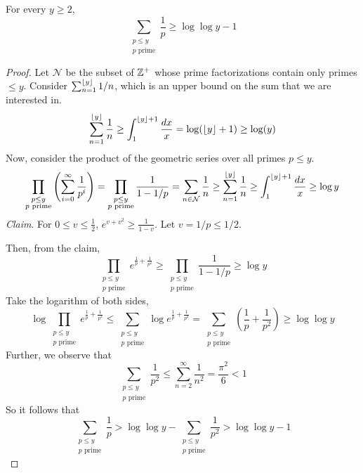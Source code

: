 \begin{theorem}
    For every $y \geq 2$,
    $$
    \sum_{\substack{p \leq y \\ \text{$p$ prime}}} \frac{1}{p} \geq \log \log y - 1
    $$
\end{theorem}

\begin{proof}
    Let $\mathcal{N}$ be the subset of $\mathbb{Z}^+$ whose prime factorizations contain only primes $\leq y$. Consider $\sum_{n=1}^{\lfloor y\rfloor} 1/n$, which is an upper bound on the sum that we are interested in.
    \begin{equation}
    \sum_{n=1}^{\lfloor y\rfloor} \frac{1}{n} \geq \int_{1}^{\lfloor y\rfloor + 1} \frac{dx}{x} = \log (\lfloor y\rfloor+1) \geq \log (y)
    \end{equation}
    Now, consider the product of the geometric series over all primes $p \leq y$.
    \begin{equation}
        \prod_{\substack{p \leq y \\ \text{$p$ prime}}} \left( \sum_{i=0}^\infty \frac{1}{p^i} \right) = \prod_{\substack{p \leq y \\ \text{$p$ prime}}} \frac{1}{1 - 1/p} = \sum_{n \in \mathcal{N}} \frac{1}{n} \geq \sum_{n=1}^{\lfloor y\rfloor} \frac{1}{n} \geq \int_{1}^{\lfloor y\rfloor + 1} \frac{dx}{x} \geq \log y
    \end{equation}
    \textit{Claim}. For $0 \leq v \leq \frac{1}{2}$, $e^{v+v^2} \geq \frac{1}{1-v}$. Let $v = 1/p \leq 1/2$.

    Then, from the claim,
    \begin{equation}
    \prod_{\substack{p \leq y \\ \text{$p$ prime}}} e^{\frac{1}{p} + \frac{1}{p^2}} \geq \prod_{\substack{p \leq y \\ \text{$p$ prime}}} \frac{1}{1-1/p} \geq \log y
    \end{equation}
    Take the logarithm of both sides,
    \begin{equation}
        \log \prod_{\substack{p \leq y \\ \text{$p$ prime}}} e^{\frac{1}{p} + \frac{1}{p^2}} \leq \sum_{\substack{p \leq y \\ \text{$p$ prime}}} \log e^{\frac{1}{p} + \frac{1}{p^2}} = \sum_{\substack{p \leq y \\ \text{$p$ prime}}} \left( \frac{1}{p} + \frac{1}{p^2} \right) \geq \log \log y 
    \end{equation}
    Further, we observe that
    \begin{equation}
        \sum_{\substack{p \leq y \\ \text{$p$ prime}}} \frac{1}{p^2} \leq \sum_{n=2}^{\infty} \frac{1}{n^2} = \frac{\pi^2}{6} < 1
    \end{equation}
    So it follows that
    \begin{equation}
        \sum_{\substack{p \leq y \\ \text{$p$ prime}}} \frac{1}{p} > \log \log y - \sum_{\substack{p \leq y \\ \text{$p$ prime}}} \frac{1}{p^2} > \log \log y - 1
    \end{equation}
\end{proof}

